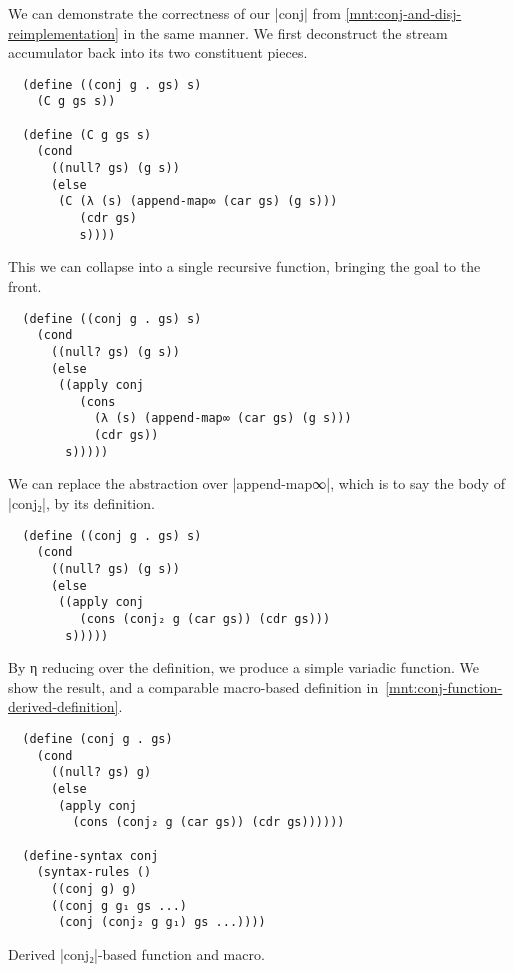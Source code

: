 \documentclass[sigplan,screen,draft,anonymous,review,natbib=false]{acmart}
\begin{document}
We can demonstrate the correctness of our \rackinline|conj| from
\cref{mnt:conj-and-disj-reimplementation} in the same manner. We first
deconstruct the stream accumulator back into its two constituent
pieces.

\begin{verbatim}
  (define ((conj g . gs) s)
    (C g gs s))

  (define (C g gs s)
    (cond
      ((null? gs) (g s))
      (else
       (C (λ (s) (append-map∞ (car gs) (g s)))
          (cdr gs)
          s))))
\end{verbatim}

This we can collapse into a single recursive function, bringing the
goal to the front.

\begin{verbatim}
  (define ((conj g . gs) s)
    (cond
      ((null? gs) (g s))
      (else
       ((apply conj
          (cons
            (λ (s) (append-map∞ (car gs) (g s)))
            (cdr gs))
        s)))))
\end{verbatim}

We can replace the abstraction over \rackinline|append-map∞|, which is
to say the body of \rackinline|conj₂|, by its definition.

\begin{verbatim}
  (define ((conj g . gs) s)
    (cond
      ((null? gs) (g s))
      (else
       ((apply conj
          (cons (conj₂ g (car gs)) (cdr gs)))
        s)))))
\end{verbatim}

By η reducing over the definition, we produce a simple variadic
function. We show the result, and a comparable macro-based definition
in~\cref{mnt:conj-function-derived-definition}.

\begin{listing}
\begin{verbatim}
  (define (conj g . gs)
    (cond
      ((null? gs) g)
      (else
       (apply conj
         (cons (conj₂ g (car gs)) (cdr gs))))))

  (define-syntax conj
    (syntax-rules ()
      ((conj g) g)
      ((conj g g₁ gs ...)
       (conj (conj₂ g g₁) gs ...))))
\end{verbatim}
  \caption{Derived \rackinline|conj₂|-based function and macro.}
  \label{mnt:conj-function-derived-definition}
\end{listing}
\end{document}
